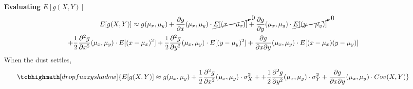 \textbf{Evaluating $E[g(X,Y)]$}
\begin{gather*}
	E[g(X,Y)] \approx g(\mu_x, \mu_y) + \dfrac{\partial g}{\partial x}(\mu_x, \mu_y) \cdot \cancelto{0}{E[(x - \mu_x)]} + \dfrac{\partial g}{\partial y}(\mu_x, \mu_y) \cdot \cancelto{0}{E[(y - \mu_y)]}\\
		+ \frac{1}{2} \dfrac{\partial^2 g}{\partial x^2}(\mu_x, \mu_y) \cdot E[(x - \mu_x)^2] + \frac{1}{2} \dfrac{\partial^2 g}{\partial y^2}(\mu_x, \mu_y) \cdot E[(y - \mu_y)^2] + \dfrac{\partial g}{\partial x \partial y}(\mu_x, \mu_y) \cdot E[(x - \mu_x) (y - \mu_y)]
\end{gather*}
When the dust settles,
\begin{gather*}
	\tcbhighmath[drop fuzzy shadow]{E[g(X,Y)] \approx g(\mu_x, \mu_y) + \frac{1}{2} \dfrac{\partial^2 g}{\partial x^2}(\mu_x, \mu_y) \cdot \sigma_X^2 + + \frac{1}{2} \dfrac{\partial^2 g}{\partial y^2}(\mu_x, \mu_y) \cdot \sigma_Y^2 + \dfrac{\partial g}{\partial x \partial y}(\mu_x, \mu_y) \cdot Cov(X,Y)}
\end{gather*}